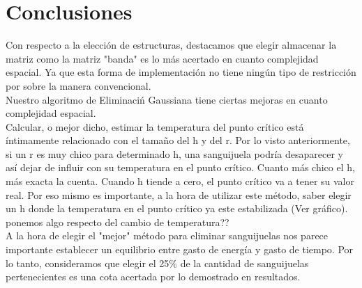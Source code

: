 \documentclass[double, 1.5in, 12pt]{beavtex}
\begin{document}
\color{red}{
[VER Y ANALIZAR LOS GRAFICOS QUE COMPARAN LOS ALGORITMOS. DESCRIBIRLOS. PONER LAS CONCLUSIONES EN CONCLUSIONES!]
Idea: Podemos aclarar que “mas proximo” esperabamos que fuera cualquiera y dio mejor de lo esperado.” Funcionan relativamente parecido cuando la discretizacion es grande, porque es un mecanismo “paleativo” pero en cuando se empieza a hacer una granularidad mas chiquita y la precision es mayor, el metodo de porcentaje es el mejor: Ya que vas a matar 4 en cualquiera de los dos casos, es preferible que mates aquellas que aumentan mas la temperatura del punto critico. 
}





\chapter{Conclusiones}

Con respecto a la elecci\'on de estructuras, destacamos que elegir almacenar la matriz como la matriz "banda" es lo m\'as acertado en cuanto complejidad espacial. Ya que esta forma de implementaci\'on no tiene ning\'un tipo de restricci\'on por sobre la manera convencional. \\
Nuestro algoritmo de Eliminaci\'n Gaussiana tiene ciertas mejoras en cuanto complejidad espacial.\\

Calcular, o mejor dicho, estimar la temperatura del punto cr\'itico est\'a \'intimamente relacionado con el tama\~no del h y del r. Por lo visto anteriormente, si un r es muy chico para determinado h, una sanguijuela podr\'ia desaparecer y as\'i dejar de influir con su temperatura en el punto cr\'itico. Cuanto m\'as chico el h, m\'as exacta la cuenta. Cuando h tiende a cero, el punto cr\'itico va a tener su valor real. Por eso mismo es importante, a la hora de utilizar este m\'etodo, saber elegir un h donde la temperatura en el punto cr\'itico ya este estabilizada (Ver gr\'afico). \\

ponemos algo respecto del cambio de temperatura?? \\

A la hora de elegir el "mejor" m\'etodo para eliminar sanguijuelas nos parece importante establecer un equilibrio entre gasto de energ\'ia y gasto de tiempo. Por lo tanto, consideramos que elegir el 25$\%$ de la cantidad de sanguijuelas pertenecientes es una cota acertada por lo demostrado en resultados. \\
\end{document}
